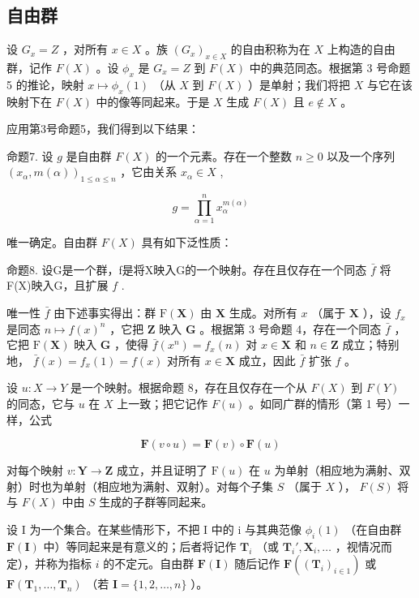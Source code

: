 \subsection{自由群}

设 \(G_x = Z\) ，对所有 \(x \in X\) 。族 \((G_x)_{x \in X}\) 的自由积称为在 \(X\) 上构造的自由群，记作 \(F(X)\) 。设 \(\phi_x\) 是 \(G_x = Z\) 到 \(F(X)\) 中的典范同态。根据第 3 号命题 5 的推论，映射 \(x \mapsto \phi_x(1)\) （从 \(X\) 到 \(F(X)\) ）是单射；我们将把 \(X\) 与它在该映射下在 \(F(X)\) 中的像等同起来。于是 \(X\) 生成 \(F(X)\) 且 \(e \notin X\) 。

应用第3号命题5，我们得到以下结果：

命题7. 设 \(g\) 是自由群 \(F(X)\) 的一个元素。存在一个整数 \(n \geqslant 0\) 以及一个序列 \((x_{\alpha}, m(\alpha))_{1 \leqslant \alpha \leqslant n}\) ，它由关系 \(x_{\alpha} \in X\) ,

\[
g = \prod_ {\alpha = 1} ^ {n} x _ {\alpha} ^ {m (\alpha)}
\]

唯一确定。自由群 \(F(X)\) 具有如下泛性质：

命题8. 设G是一个群，f是将X映入G的一个映射。存在且仅存在一个同态 \(\bar{f}\) 将F(X)映入G，且扩展 \(f\) .

唯一性 \(\bar{f}\) 由下述事实得出：群 \(\mathrm{F}(\mathbf{X})\) 由 \(\mathbf{X}\) 生成。对所有 \(x\) （属于 \(\mathbf{X}\) ），设 \(f_x\) 是同态 \(n \mapsto f(x)^n\) ，它把 \(\mathbf{Z}\) 映入 \(\mathbf{G}\) 。根据第 3 号命题 4，存在一个同态 \(\bar{f}\) ，它把 \(\mathrm{F}(\mathbf{X})\) 映入 \(\mathbf{G}\) ，使得 \(\bar{f}(x^n) = f_x(n)\) 对 \(x \in \mathbf{X}\) 和 \(n \in \mathbf{Z}\) 成立；特别地， \(\bar{f}(x) = f_x(1) = f(x)\) 对所有 \(x \in \mathbf{X}\) 成立，因此 \(\bar{f}\) 扩张 \(f\) 。

设 \(u: X \to Y\) 是一个映射。根据命题 8，存在且仅存在一个从 \(F(X)\) 到 \(F(Y)\) 的同态，它与 \(u\) 在 \(X\) 上一致；把它记作 \(F(u)\) 。如同广群的情形（第 1 号）一样，公式

\[
\mathbf {F} (v \circ u) = \mathbf {F} (v) \circ \mathbf {F} (u)
\]

对每个映射 \(v: \mathbf{Y} \to \mathbf{Z}\) 成立，并且证明了 \(\mathrm{F}(u)\) 在 \(u\) 为单射（相应地为满射、双射）时也为单射（相应地为满射、双射）。对每个子集 \(S\) （属于 \(X\) ）， \(F(S)\) 将与 \(F(X)\) 中由 \(S\) 生成的子群等同起来。

设 I 为一个集合。在某些情形下，不把 I 中的 i 与其典范像 \(\phi_i(1)\) （在自由群 \(\mathbf{F}(\mathbf{I})\) 中）等同起来是有意义的；后者将记作 \(\mathbf{T}_i\) （或 \(\mathbf{T}_i', \mathbf{X}_i, \ldots\) ，视情况而定），并称为指标 \(i\) 的不定元。自由群 \(\mathbf{F}(\mathbf{I})\) 随后记作 \(\mathbf{F}((\mathbf{T}_i)_{i \in 1})\) 或 \(\mathbf{F}(\mathbf{T}_1, \ldots, \mathbf{T}_n)\) （若 \(\mathbf{I} = \{1, 2, \ldots, n\}\) ）。

